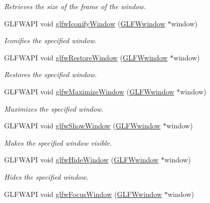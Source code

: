 \begin{DoxyCompactItemize}
\begin{DoxyCompactList}\small\item\em Retrieves the size of the frame of the window. \end{DoxyCompactList}\item 
G\+L\+F\+W\+A\+PI void \hyperlink{group__window_ga24274e3c6ecd44e11fec5e6b66e4d7f3}{glfw\+Iconify\+Window} (\hyperlink{group__window_ga3c96d80d363e67d13a41b5d1821f3242}{G\+L\+F\+Wwindow} $\ast$window)
\begin{DoxyCompactList}\small\item\em Iconifies the specified window. \end{DoxyCompactList}\item 
G\+L\+F\+W\+A\+PI void \hyperlink{group__window_ga1e29caf0b819f578b04db52fff17256c}{glfw\+Restore\+Window} (\hyperlink{group__window_ga3c96d80d363e67d13a41b5d1821f3242}{G\+L\+F\+Wwindow} $\ast$window)
\begin{DoxyCompactList}\small\item\em Restores the specified window. \end{DoxyCompactList}\item 
G\+L\+F\+W\+A\+PI void \hyperlink{group__window_ga4f825a55367d3fabde3d06e7f30128e8}{glfw\+Maximize\+Window} (\hyperlink{group__window_ga3c96d80d363e67d13a41b5d1821f3242}{G\+L\+F\+Wwindow} $\ast$window)
\begin{DoxyCompactList}\small\item\em Maximizes the specified window. \end{DoxyCompactList}\item 
G\+L\+F\+W\+A\+PI void \hyperlink{group__window_ga7945bcdff9e5e058cf36505d6873ed8c}{glfw\+Show\+Window} (\hyperlink{group__window_ga3c96d80d363e67d13a41b5d1821f3242}{G\+L\+F\+Wwindow} $\ast$window)
\begin{DoxyCompactList}\small\item\em Makes the specified window visible. \end{DoxyCompactList}\item 
G\+L\+F\+W\+A\+PI void \hyperlink{group__window_gaa17e287d521544bdeceafa09ac036e20}{glfw\+Hide\+Window} (\hyperlink{group__window_ga3c96d80d363e67d13a41b5d1821f3242}{G\+L\+F\+Wwindow} $\ast$window)
\begin{DoxyCompactList}\small\item\em Hides the specified window. \end{DoxyCompactList}\item 
G\+L\+F\+W\+A\+PI void \hyperlink{group__window_ga0da0e3daaa2d100f44a115c09077b510}{glfw\+Focus\+Window} (\hyperlink{group__window_ga3c96d80d363e67d13a41b5d1821f3242}{G\+L\+F\+Wwindow} $\ast$window)

\end{DoxyCompactItemize}
